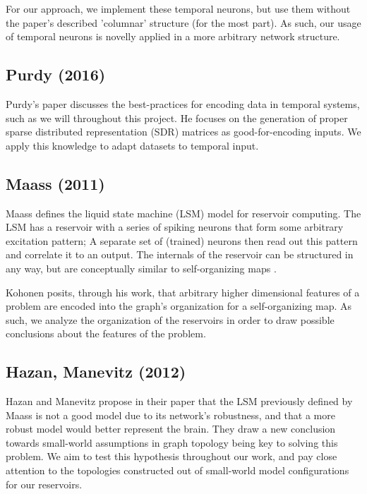 For our approach, we implement these temporal neurons, but use them without the
paper's described 'columnar' structure (for the most part). As such, our usage
of temporal neurons is novelly applied in a more arbitrary network structure.

\subsection{Purdy (2016)}

Purdy's paper \cite{Encoding} discusses the best-practices for encoding data in
temporal systems, such as we will throughout this project. He focuses on the
generation of proper sparse distributed representation (SDR) matrices as
good-for-encoding inputs. We apply this knowledge to adapt datasets to temporal
input.

\subsection{Maass (2011)}

Maass defines the liquid state machine (LSM) \cite{LSM} model for reservoir
computing. The LSM has a reservoir with a series of spiking neurons that form
some arbitrary excitation pattern; A separate set of (trained) neurons then read
out this pattern and correlate it to an output. The internals of the reservoir
can be structured in any way, but are conceptually similar to self-organizing
maps \cite{Kohonen}.

Kohonen posits, through his work, that arbitrary higher dimensional features of
a problem are encoded into the graph's organization for a self-organizing map.
As such, we analyze the organization of the reservoirs in order to draw
possible conclusions about the features of the problem.

\subsection{Hazan, Manevitz (2012)}

Hazan and Manevitz \cite{LSM Constraints} propose in their paper that the LSM
previously defined by Maass is not a good model due to its network's robustness,
and that a more robust model would better represent the brain. They draw a new
conclusion towards small-world assumptions in graph topology being key to
solving this problem. We aim to test this hypothesis throughout our work, and
pay close attention to the topologies constructed out of small-world model
configurations for our reservoirs.